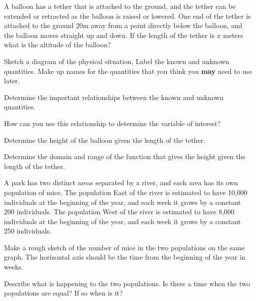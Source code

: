 \begin{problem}
\item A balloon has a tether that is attached to the ground, and the
  tether can be extended or retracted as the balloon is raised or
  lowered. One end of the tether is attached to the ground 20m away
  from a point directly below the balloon, and the balloon moves
  straight up and down. If the length of the tether is $x$ meters what
  is the altitude of the balloon?
  \begin{subproblem}
    \item Sketch a diagram of the physical situation. Label the known and
      unknown quantities. Make up names for the quantities that you
      think you \textbf{may} need to use later.
      \vfill
      \vfill
    \item Determine the important relationships between the known and
      unknown quantities.
      \vfill
    \item How can you use this relationship to determine the variable
      of interest?
      \vfill 
    \item Determine the height of the balloon given the length of the
      tether.
      \vfill
    \item Determine the domain and range of the function that gives
      the height given the length of the tether.
      \vfill
  \end{subproblem}

  \clearpage

\item A park has two distinct areas separated by a river, and each
  area has its own population of mice.  The population East of the
  river is estimated to have 10,000 individuals at the beginning of
  the year, and each week it grows by a constant 200 individuals. The
  population West of the river is estimated to have 8,000 individuals
  at the beginning of the year, and each week it grows by a constant
  250 individuals.

  \begin{subproblem}
  \item Make a rough sketch of the number of mice in the two
    populations on the same graph. The horizontal axis should be the
    time from the beginning of the year in weeks.
    \vfill

  \item Describe what is happening to the two populations. Is there a
    time when the two populations are equal? If so when is it?
    \vfill


\end{subproblem}
\end{problem}
